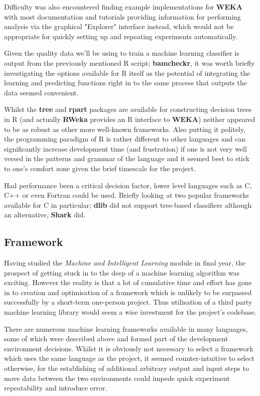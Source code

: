 Difficulty was also encountered finding example implementations for \textbf{WEKA}
with most documentation and tutorials providing information for performing
analysis via the graphical "Explorer" interface instead, which would not be
appropriate for quickly setting up and repeating experiments automatically.

Given the quality data we'll be using to train a machine learning classifier is
output from the previously mentioned R script; \textbf{bamcheckr}, it was worth
briefly investigating the options available for R itself as the potential of
integrating the learning and predicting functions right in to the same process
that outputs the data seemed convenient.

Whilst the \textbf{tree}\citep{man:rtree} and \textbf{rpart}\citep{man:rpart}
packages are available for constructing decision trees in R (and actually
\textbf{RWeka} provides an R interface to \textbf{WEKA}) neither appeared to be
as robust as other more well-known frameworks. Also putting it politely, the
programming paradigm of R\citep{man:R} is rather different to other languages
and can significantly increase development time (and frustration\citep{argh}) if
one is not very well versed in the patterns and grammar of the language  and it
seemed best to stick to one's comfort zone given the brief timescale for the
project.

Had performance been a critical decision factor, lower level languages such as
C, C++ or even Fortran could be used. Briefly looking at two popular frameworks
available for C in particular; \textbf{dlib} did not support tree-based
classifiers although an alternative, \textbf{Shark} did.


\subsection{Framework}

Having studied the \textit{Machine and Intelligent Learning} module in final
year, the prospect of getting stuck in to the deep of a machine learning
algorithm was exciting. However the reality is that a lot of cumulative time and
effort has gone in to creation and optimisation of a framework which is unlikely
to be surpassed successfully by a short-term one-person project. Thus
utilisation of a third party machine learning library would seem a wise
investment for the project's codebase.

There are numerous machine learning frameworks available in many languages, some
of which were described above and formed part of the development environment
decisions. Whilst it is obviously not necessary to select a framework which uses
the same language as the project, it seemed counter-intuitive to select otherwise,
for the establishing of additional arbitrary output and input steps to move data
between the two environments could impede quick experiment repeatability and
introduce error.

